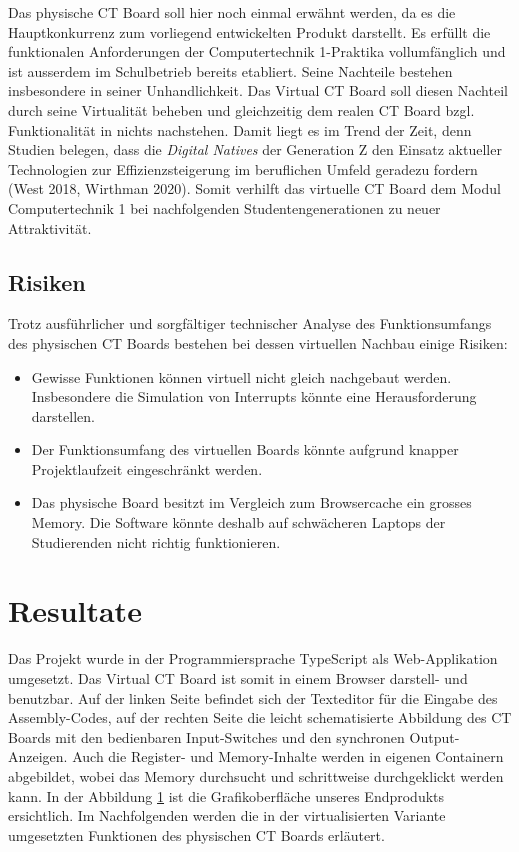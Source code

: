 \documentclass[10pt]{article}
\begin{document}
Das physische CT Board soll hier noch einmal erwähnt werden, da es die Hauptkonkurrenz zum vorliegend entwickelten Produkt darstellt. Es erfüllt die funktionalen Anforderungen der \glqq Computertechnik 1\grqq-Praktika vollumfänglich und ist ausserdem im Schulbetrieb bereits etabliert. Seine Nachteile bestehen insbesondere in seiner Unhandlichkeit. Das \glqq Virtual CT Board\grqq{} soll diesen Nachteil durch seine Virtualität beheben und gleichzeitig dem realen CT Board bzgl. Funktionalität in nichts nachstehen. Damit liegt es im Trend der Zeit, denn Studien belegen, dass die \emph{Digital Natives} der Generation Z den Einsatz aktueller Technologien zur Effizienzsteigerung im beruflichen Umfeld geradezu fordern (West 2018, Wirthman 2020). Somit verhilft das virtuelle CT Board dem Modul \glqq Computertechnik 1\grqq{} bei nachfolgenden Studentengenerationen zu neuer Attraktivität.


\subsection{Risiken}
Trotz ausführlicher und sorgfältiger technischer Analyse des Funktionsumfangs des physischen CT Boards bestehen bei dessen virtuellen Nachbau einige Risiken:
\begin{itemize}
\item Gewisse Funktionen können virtuell nicht gleich nachgebaut werden. Insbesondere die Simulation von Interrupts könnte eine Herausforderung darstellen.
\item Der Funktionsumfang des virtuellen Boards könnte aufgrund knapper Projektlaufzeit eingeschränkt werden. 
\item Das physische Board besitzt im Vergleich zum Browsercache ein grosses Memory. Die Software könnte deshalb auf schwächeren Laptops der Studierenden nicht richtig funktionieren. 
\end{itemize}

\section{Resultate}

Das Projekt wurde in der Programmiersprache TypeScript als Web-Applikation umgesetzt. Das \glqq Virtual CT Board\grqq{} ist somit in einem Browser darstell- und benutzbar. Auf der linken Seite befindet sich der Texteditor für die Eingabe des Assembly-Codes, auf der rechten Seite die leicht schematisierte Abbildung des CT Boards mit den bedienbaren Input-Switches und den synchronen Output-Anzeigen. Auch die Register- und Memory-Inhalte werden in eigenen Containern abgebildet, wobei das Memory durchsucht und schrittweise durchgeklickt werden kann. In der Abbildung \ref{} ist die Grafikoberfläche unseres Endprodukts ersichtlich. Im Nachfolgenden werden die in der virtualisierten Variante umgesetzten Funktionen des physischen CT Boards erläutert.
\end{document}
